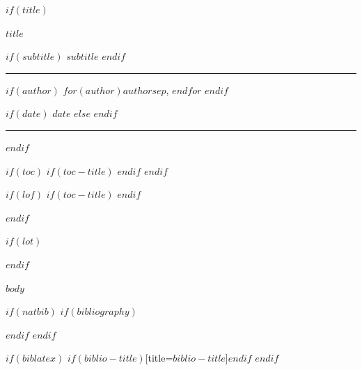 \documentclass[
  paper=a4,
  fontsize=11pt,
  parskip=half,
  headings=standardclasses,
  numbers=noenddot,
  toc=bibliographynumbered,
  captions=tableheading
]{scrartcl}
\renewcommand{\[}{\begin{dmath}}
\renewcommand{\]}{\end{dmath}}
\begin{document}
$if(title)$
\begin{titlepage}
\begin{center}

\vspace*{3cm}

{\Huge\bfseries\sffamily\color{headercolor} $title$}

\vspace{1.5em}

$if(subtitle)$
{\Large\sffamily\color{black!70} $subtitle$}
\vspace{1em}
$endif$

\vspace{2em}
{\color{headercolor}\rule{0.7\textwidth}{2pt}}
\vspace{2em}

$if(author)$
{\large\sffamily $for(author)$$author$$sep$, $endfor$}
\vspace{1em}
$endif$

$if(date)$
{\large\sffamily\color{black!60} $date$}
$else$
{\large\sffamily\color{black!60} \DTMtoday}
$endif$

\vfill

{\color{headercolor}\rule{0.4\textwidth}{1pt}}

\end{center}
\end{titlepage}
\newpage
$endif$

$if(toc)$
$if(toc-title)$
\renewcommand{\contentsname}{$toc-title$}
$endif$
\setcounter{tocdepth}{$toc-depth$}
\tableofcontents
\newpage
$endif$

$if(lof)$
$if(toc-title)$
\renewcommand{\listfigurename}{$lof-title$}
$endif$
\listoffigures
\newpage
$endif$

$if(lot)$
\renewcommand{\listtablename}{$lot-title$}
\listoftables
\newpage
$endif$

$body$

$if(natbib)$
$if(bibliography)$

$endif$
$endif$

$if(biblatex)$
\printbibliography$if(biblio-title)$[title=$biblio-title$]$endif$
$endif$
\end{document}
